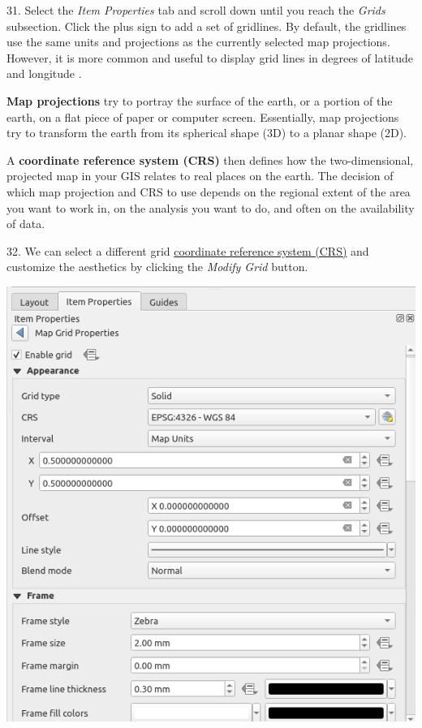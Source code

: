 \documentclass[oneside,a4paper,11pt,explicit]{book}
\begin{document}
31. Select the \textit{Item Properties} tab and scroll down until you reach the \textit{Grids} subsection. Click the plus sign to add a set of gridlines. By default, the gridlines use the same units and projections as the currently selected map projections. However, it is more common and useful to display grid lines in degrees of latitude and longitude . 

\begin{tcolorbox}[colback=yellow!5!white,colframe=yellow!50!black,
  colbacktitle=yellow!75!black,title=Coordinate Reference Systems (CRS)]
\textbf{Map projections} try to portray the surface of the earth, or a portion of the earth, on a flat piece of paper or computer screen. Essentially, map projections try to transform the earth from its spherical shape (3D) to a planar shape (2D).

A \textbf{coordinate reference system (CRS)} then defines how the two-dimensional, projected map in your GIS relates to real places on the earth. The decision of which map projection and CRS to use depends on the regional extent of the area you want to work in, on the analysis you want to do, and often on the availability of data.
\end{tcolorbox}

32. We can select a different grid \href{https://en.wikipedia.org/wiki/Spatial_reference_system}{coordinate reference system (CRS)} and customize the aesthetics by clicking the \textit{Modify Grid} button.

\vspace{.25em}

\centerline{\includegraphics[width=.5\textwidth]{GridProps1.png}}
\end{document}
